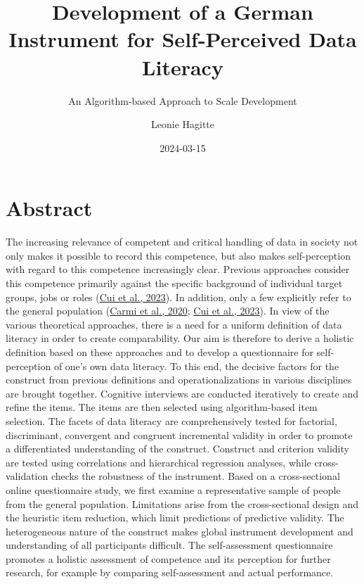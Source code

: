\documentclass[
  12pt,
  a4paper,
  twoside]{article}
\title{Development of a German Instrument for Self-Perceived Data Literacy}
\subtitle{An Algorithm-based Approach to Scale Development}
\author{Leonie Hagitte}
\date{2024-03-15}
\begin{document}
\maketitle

{
\setcounter{tocdepth}{2}
\tableofcontents
}
\newpage\null\thispagestyle{empty}\newpage

\hypertarget{abstract}{%
\section*{Abstract}\label{abstract}}

The increasing relevance of competent and critical handling of data in society not only makes it possible to record this competence, but also makes self-perception with regard to this competence increasingly clear. Previous approaches consider this competence primarily against the specific background of individual target groups, jobs or roles (\protect\hyperlink{ref-Cui2023}{Cui et al., 2023}). In addition, only a few explicitly refer to the general population (\protect\hyperlink{ref-Carmi2020}{Carmi et al., 2020}; \protect\hyperlink{ref-Cui2023}{Cui et al., 2023}). In view of the various theoretical approaches, there is a need for a uniform definition of data literacy in order to create comparability.
Our aim is therefore to derive a holistic definition based on these approaches and to develop a questionnaire for self-perception of one's own data literacy. To this end, the decisive factors for the construct from previous definitions and operationalizations in various disciplines are brought together. Cognitive interviews are conducted iteratively to create and refine the items. The items are then selected using algorithm-based item selection. The facets of data literacy are comprehensively tested for factorial, discriminant, convergent and congruent incremental validity in order to promote a differentiated understanding of the construct. Construct and criterion validity are tested using correlations and hierarchical regression analyses, while cross-validation checks the robustness of the instrument.
Based on a cross-sectional online questionnaire study, we first examine a representative sample of people from the general population. Limitations arise from the cross-sectional design and the heuristic item reduction, which limit predictions of predictive validity. The heterogeneous nature of the construct makes global instrument development and understanding of all participants difficult.
The self-assessment questionnaire promotes a holistic assessment of competence and its perception for further research, for example by comparing self-assessment and actual performance.
\end{document}
